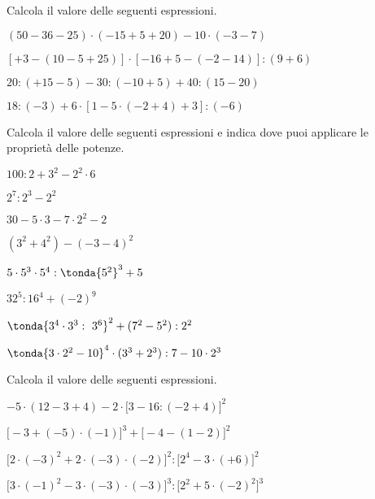 \begin{esercizio} %
Calcola il valore delle seguenti espressioni.
 \begin{enumeratees}
 \item \((50-36-25)\cdot (-15+5+20)-10\cdot (-3-7)\)  
 \item \([+3-(10-5+25)]\cdot [-16+5-(-2-14)]:(9+6)\)  
 \item \(20:(+15-5)-30:(-10+5)+40:(15-20)\)  
 \item \(18:(-3)+6\cdot [1-5\cdot (-2+4)+3]: (-6)\)  
\end{enumeratees}
\end{esercizio}

\begin{esercizio} %
Calcola il valore delle seguenti espressioni e indica dove puoi applicare le 
proprietà delle potenze.

\vspace{-.5em}
\begin{htmulticols}{2}
\begin{enumeratees}
 \item \(100:2+3^2 -2^2\cdot 6\)  
 \item \(2^7:2^3 -2^2\)  
 \item \(30-5\cdot 3 -7\cdot 2^2 -2\)  
 \item \((3^2 +4^2) -(-3-4)^2\)  
 \item \(5\cdot 5^3\cdot 5^4: \tonda{5^2 }^3 +5\)  
 \item \(32^5:16^4 +(-2)^9\)  
 \item \(\tonda{3^4\cdot 3^3:~3^6 }^2 +(7^2-5^2):2^2\)  
 \item \(\tonda{3\cdot 2^2 -10 }^4\cdot (3^3+2^3):7-10\cdot 2^3\)  
\end{enumeratees}
\end{htmulticols}
\end{esercizio}

\begin{esercizio} %
Calcola il valore delle seguenti espressioni.
 \begin{enumeratees}
 \item \(-5\cdot(12-3+4)-2\cdot\big[3-16:(-2+4)\big]^2\)  
 \item \(\big[-3+(-5)\cdot(-1)\big]^3+\big[-4-(1-2)\big]^2\)  
 \item 
\(\big[2\cdot(-3)^2+2\cdot(-3)\cdot(-2)\big]^2:\big[2^4-3\cdot(+6)\big]^2\)
 \item 
\(\big[3\cdot(-1)^2-3\cdot(-3)\cdot(-3)\big]^3:\big[2^2+5\cdot(-2)^2\big]^3\)
 \end{enumeratees}
\end{esercizio}


